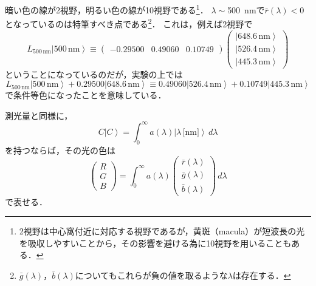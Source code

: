 \documentclass[uplatex,paper=a4,fontsize=4.0truemm,jafontsize=4.0truemm,head_space=30.0truemm,foot_space=30.0truemm,baselineskip=8.0truemm,line_length=40zw,gutter=25.0truemm,oneside,openany,fleqn,hanging_panctuation,open_bracket_pos=nibu_tentsuki,dvipdfmx,jis2004,book,titlepage]{jlreq}
\theoremstyle{mystyle}
\newcommand{\mathdisplaystyle}[1]{\(\displaystyle{#1}\)}
\newcommand{\negativevalue}[1]{{-#1}}
\newcommand{\parentheses}[1]{\left(#1\right)}
\newcommand{\Diracket}[1]{\left\lvert#1\right\rangle}
\newcommand{\easymatrix}[1]{\mathord{\begin{pmatrix}#1\end{pmatrix}}}
\begin{document}
			暗い色の線が2\textdegree 視野，明るい色の線が10\textdegree 視野である\footnote{2\textdegree 視野は中心窩付近に対応する視野であるが，黄斑（macula）が短波長の光を吸収しやすいことから，その影響を避ける為に10\textdegree 視野を用いることもある．}．
			\mathdisplaystyle{\lambda\sim{}}\SI{500}{nm}で\mathdisplaystyle{\bar{r}\parentheses{\lambda}<0}となっているのは特筆すべき点である\footnote{\mathdisplaystyle{\bar{g}\parentheses{\lambda}}，\mathdisplaystyle{\bar{b}\parentheses{\lambda}}についてもこれらが負の値を取るような\mathdisplaystyle{\lambda}は存在する．}．
			これは，例えば2\textdegree 視野で
			\begin{equation*}
				L_{500\,\textrm{nm}}\Diracket{500\,\textrm{nm}}\equiv \easymatrix{\negativevalue{0.29500} & 0.49060 & 0.10749}\easymatrix{\Diracket{648.6\,\textrm{nm}} \\ \Diracket{526.4\,\textrm{nm}} \\ \Diracket{445.3\,\textrm{nm}}}
			\end{equation*}
			ということになっているのだが，実験の上では
			\begin{equation*}
				L_{500\,\textrm{nm}}\Diracket{500\,\textrm{nm}}+0.29500\Diracket{648.6\,\textrm{nm}}\equiv0.49060\Diracket{526.4\,\textrm{nm}}+0.10749\Diracket{445.3\,\textrm{nm}}
			\end{equation*}
			で条件等色になったことを意味している．

			測光量と同様に，
			\begin{equation*}
				C\Diracket{C}=\int_0^\infty{a\parentheses{\lambda}\Diracket{\lambda\,\textrm{[nm]}}}\,d\lambda
			\end{equation*}
			を持つならば，その光の色は
			\begin{equation*}
				\easymatrix{R \\ G \\ B}=\int_0^\infty{a\parentheses{\lambda}\easymatrix{\bar{r}\parentheses{\lambda} \\ \bar{g}\parentheses{\lambda} \\ \bar{b}\parentheses{\lambda}}}\,d\lambda
			\end{equation*}
			で表せる．
\end{document}
